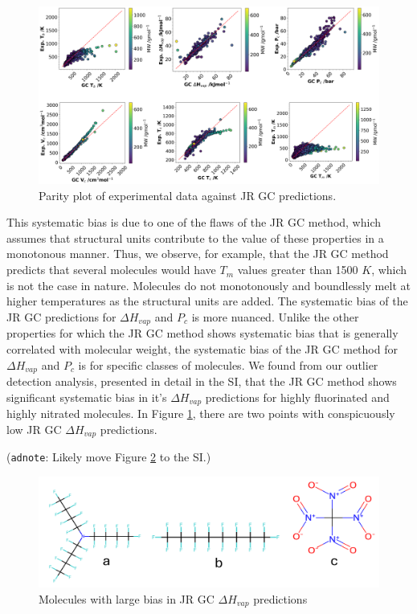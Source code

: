 \documentclass[journal=jacsat,manuscript=article]{achemso}
\newcommand{\adnote}[1]{{\color{OliveGreen} (\texttt{adnote}: #1)}}
\begin{document}
\begin{figure}[H]
    \centering
    \includegraphics[width=1.1\linewidth]{images/2D_GC_bias.png}
    \caption{Parity plot of experimental data against JR GC predictions.}
    \label{fig:2D_JRGC_bias}
\end{figure}

This systematic bias is due to one of the flaws of the JR GC method, which assumes that structural units contribute to the value of these properties in a monotonous manner. Thus, we observe, for example, that the JR GC method predicts that several molecules would have $T_m$ values greater than 1500 $K$, which is not the case in nature. Molecules do not monotonously and boundlessly melt at higher temperatures as the structural units are added.
The systematic bias of the JR GC predictions for $\Delta H_{vap}$ and $P_c$ is more nuanced. Unlike the other properties for which the JR GC method shows systematic bias that is generally correlated with molecular weight, the systematic bias of the JR GC method for $\Delta H_{vap}$ and $P_c$ is for specific classes of molecules.
We found from our outlier detection analysis, presented in detail in the SI, that the JR GC method shows significant systematic bias in it's $\Delta H_{vap}$ predictions for highly fluorinated and highly nitrated molecules. In Figure \ref{fig:2D_JRGC_bias}, there are two points with conspicuously low JR GC $\Delta H_{vap}$ predictions. 

\adnote{Likely move Figure \ref{fig:JRGC_Hvap_bias_molecules} to the SI.}

\begin{figure}[H]
    \centering
    \includegraphics[width=0.8\linewidth]{images/Hvap_molecules_with_large_bias.png}
    \caption{Molecules with large bias in JR GC $\Delta H_{vap}$ predictions}
    \label{fig:JRGC_Hvap_bias_molecules}
\end{figure}
\end{document}
